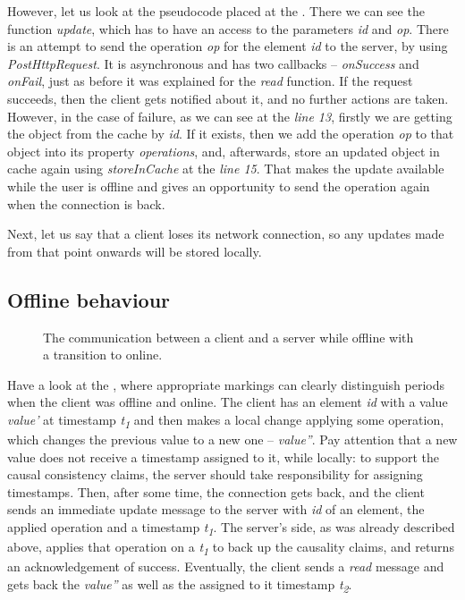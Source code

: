 However, let us look at the pseudocode placed at the . There we can see the function \textit{update}, which has to have an access to the parameters \textit{id} and \textit{op}. There is an attempt to send the operation \textit{op} for the element \textit{id} to the server, by using \textit{PostHttpRequest}. It is asynchronous and has two callbacks -- \textit{onSuccess} and \textit{onFail}, just as before it was explained for the \textit{read} function. If the request succeeds, then the client gets notified about it, and no further actions are taken. However, in the case of failure, as we can see at the \textit{line 13}, firstly we are getting the object from the cache by \textit{id}. If it exists, then we add the operation \textit{op} to that object into its property \textit{operations}, and, afterwards, store an updated object in cache again using \textit{storeInCache} at the \textit{line 15}. That makes the update available while the user is offline and gives an opportunity to send the operation again when the connection is back.

Next, let us say that a client loses its network connection, so any updates made from that point onwards will be stored locally.  

\subsection*{Offline behaviour}

\begin{figure}[!htb]
    \begin{center}
    \def\svgwidth{\linewidth}
    
    \caption {The communication between a client and a server while offline with a transition to online.}
    \label{fig:design4}
\end{center}
\end{figure}

Have a look at the , where appropriate markings can clearly distinguish periods when the client was offline and online. The client has an element \textit{id} with a value \textit{value'} at timestamp \textit{t\textsubscript{1}} and then makes a local change applying some operation, which changes the previous value to a new one -- \textit{value''}. Pay attention that a new value does not receive a timestamp assigned to it, while locally: to support the causal consistency claims, the server should take responsibility for assigning timestamps. Then, after some time, the connection gets back, and the client sends an immediate update message to the server with \textit{id} of an element, the applied operation and a timestamp \textit{t\textsubscript{1}}. The server's side, as was already described above, applies that operation on a \textit{t\textsubscript{1}} to back up the causality claims, and returns an acknowledgement of success. Eventually, the client sends a \textit{read} message and gets back the \textit{value''} as well as the assigned to it timestamp \textit{t\textsubscript{2}}.

